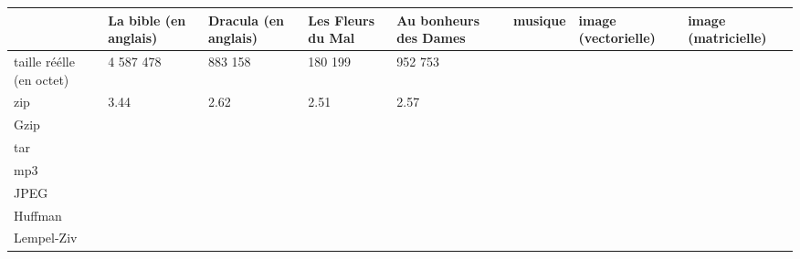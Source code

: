 \documentclass{report}
\begin{document}
\begin{center}
{\renewcommand{\arraystretch}{2}
\begin{tabular}{|p{1.5cm}|p{1.5cm}|p{1.5cm}|p{1.5cm}|p{1.5cm}|p{1.5cm}|p{1.5cm}|p{1.5cm}|}
\hline
 & La bible (en anglais) &  Dracula (en anglais) & Les Fleurs du Mal  & Au bonheurs des Dames & musique  & image (vectorielle) & image (matricielle)   \\
\hline
taille réélle (en octet) & 4 587 478 & 883 158 & 180 199 & 952 753 & & & \\\hline
zip & 3.44 & 2.62 & 2.51 & 2.57 & & & \\
\hline
Gzip & & & & & & & \\
\hline
tar & & & & & & & \\
\hline
mp3 & & & & & & & \\
\hline
JPEG & & & & & & & \\
\hline
Huffman & & & & & & & \\
\hline
Lempel-Ziv & & & & & & & \\
\hline

\end{tabular}
}
\end{center}
\end{document}
